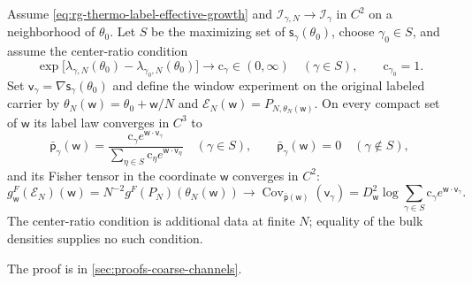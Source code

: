 \label{eq:rg-thermo-label-window}
Assume \eqref{eq:rg-thermo-label-effective-growth} and $\mathcal I_{\gamma,N}\to\mathcal I_\gamma$
in $C^2$ on a neighborhood of $\theta_0$. Let $S$ be the maximizing set of
$\mathsf s_\gamma(\theta_0)$, choose $\gamma_0\in S$, and assume the center-ratio condition
\begin{equation}
\exp\bigl[\lambda_{\gamma,N}(\theta_0)-\lambda_{\gamma_0,N}(\theta_0)\bigr]\longrightarrow
\mathrm c_\gamma\in(0,\infty)\quad(\gamma\in S),
\qquad\mathrm c_{\gamma_0}=1.
\label{eq:rg-thermo-label-center-ratios}
\end{equation}
Set $\mathsf v_\gamma=\nabla\mathsf s_\gamma(\theta_0)$ and define the window experiment on the
original labeled carrier by $\theta_N(\mathsf w)=\theta_0+\mathsf w/N$ and
$\mathcal E_N(\mathsf w)=P_{N,\theta_N(\mathsf w)}$. On every compact set of $\mathsf w$ its label
law converges in $C^3$ to
\begin{equation}
\bar{\mathsf p}_\gamma(\mathsf w)=
\frac{\mathrm c_\gamma e^{\mathsf w\cdot\mathsf v_\gamma}}{\sum_{\eta\in S}\mathrm c_\eta e^{\mathsf w\cdot\mathsf v_\eta}}
\quad(\gamma\in S),
\qquad
\bar{\mathsf p}_\gamma(\mathsf w)=0\quad(\gamma\notin S),
\label{eq:rg-thermo-label-limiting-weights}
\end{equation}
and its Fisher tensor in the coordinate $\mathsf w$ converges in $C^2$:
\begin{equation}
g^F_{\mathsf w}(\mathcal E_N)(\mathsf w)=N^{-2}g^F(P_N)(\theta_N(\mathsf w))
\longrightarrow
\operatorname{Cov}_{\bar{\mathsf p}(\mathsf w)}(\mathsf v_\gamma)
=D^2_{\mathsf w}\log\sum_{\gamma\in S}\mathrm c_\gamma e^{\mathsf w\cdot\mathsf v_\gamma}.
\label{eq:rg-thermo-label-crossover-fisher}
\end{equation}
The center-ratio condition is additional data at finite $N$; equality of the bulk densities
supplies no such condition. 

The proof is in \cref{sec:proofs-coarse-channels}.


